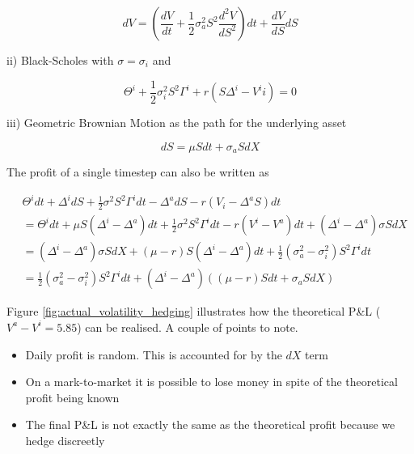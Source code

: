 \documentclass{article}
\newcommand{\para}{\vspace{8pt}} %
\begin{document}
\[
dV = (\frac{dV}{dt} + \frac{1}{2} \sigma_a^2 S^2 \frac{d^2V}{dS^2}) dt + \frac{dV}{dS} dS
\]

\para
ii) Black-Scholes with $\sigma = \sigma_i$ and 

\[
\Theta^i + \frac{1}{2} \sigma_i^2 S^2 \Gamma^i + r (S \Delta^i - V^ii) = 0
\]

\para
iii) Geometric Brownian Motion as the path for the underlying asset


\[
dS = \mu S dt + \sigma_a S dX
\]

The profit of a single timestep can also be written as

\begin{center}
\begin{align*}
& \Theta^i dt + \Delta^i dS + \frac{1}{2} \sigma^2 S^2 \Gamma ^i dt - \Delta^a dS -r(V_i - \Delta^a S) dt\\[2pt]
&= \Theta^i dt + \mu S(\Delta^i - \Delta^a) dt + \frac{1}{2} \sigma^2 S^2 \Gamma^i dt - r (V^i - V^a) dt + (\Delta^i - \Delta^a) \sigma S dX\\[2pt]
&= (\Delta^i - \Delta^a) \sigma S dX + (\mu - r) S (\Delta^i - \Delta^a) dt + \frac{1}{2} (\sigma_a^2 - \sigma_i^2) S^2 \Gamma^i dt\\[2pt]
&= \frac{1}{2}( \sigma_a^2 - \sigma_i^2) S^2 \Gamma^i dt + (\Delta^i - \Delta^a) ((\mu -r) S dt + \sigma_a S dX)
\end{align*}
\end{center}


Figure \ref{fig:actual_volatility_hedging} illustrates how the theoretical P\&L ($V^a - V^i = 5.85$) can be realised. A couple of points to note.

\begin{itemize}
    \item Daily profit is random. This is accounted for by the $dX$ term
    \item On a mark-to-market it is possible to lose money in spite of the theoretical profit being known
    \item The final P\&L is not exactly the same as the theoretical profit because we hedge discreetly
\end{itemize}
\end{document}
